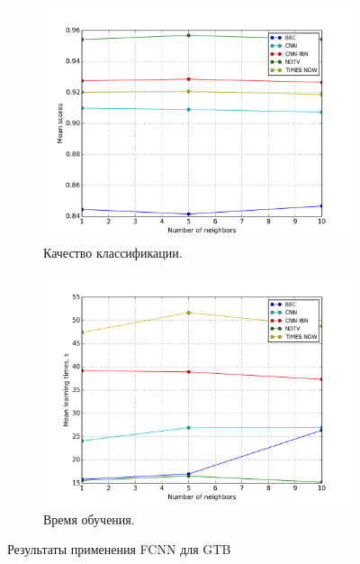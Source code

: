 \begin{figure}
	\centering
	\begin{subfigure}{0.45\textwidth}
		\includegraphics[width=\textwidth]{images/fcnn-gradboosting.png}
		\caption{Качество классификации.}
	\end{subfigure}
	\begin{subfigure}{0.45\textwidth}
		\includegraphics[width=\textwidth]{images/fcnn-gradboostingTime.png}
		\caption{Время обучения.}
	\end{subfigure}
	\caption{Результаты применения FCNN для GTB}\label{fig:fcnn-gtb-results}
\end{figure}


